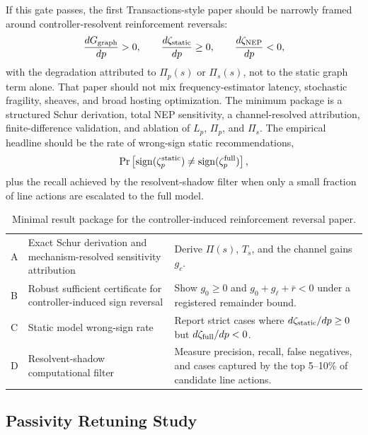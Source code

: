 If this gate passes, the first Transactions-style paper should be narrowly
framed around controller-resolvent reinforcement reversals:
\[
  \frac{dG_{\rm graph}}{dp}>0,
  \qquad
  \frac{d\zeta_{\rm static}}{dp}\ge0,
  \qquad
  \frac{d\zeta_{\rm NEP}}{dp}<0,
\]
with the degradation attributed to \(\Pi_p(s)\) or \(\Pi_s(s)\), not to the
static graph term alone. That paper should not mix frequency-estimator latency,
stochastic fragility, sheaves, and broad hosting optimization. The minimum
package is a structured Schur derivation, total NEP sensitivity, a
channel-resolved attribution, finite-difference validation, and ablation of
\(L_p\), \(\Pi_p\), and \(\Pi_s\). The empirical headline should be the rate
of wrong-sign static recommendations,
\[
  \Pr\left[
  \operatorname{sign}(\zeta_p^{\rm static})
  \ne
  \operatorname{sign}(\zeta_p^{\rm full})
  \right],
\]
plus the recall achieved by the resolvent-shadow filter when only a small
fraction of line actions are escalated to the full model.

\begin{table}[ht]
\centering
\caption{Minimal result package for the controller-induced reinforcement
reversal paper.}
\label{tab:controller_reversal_paper_package}
\begin{tabular}{L{0.18\textwidth}L{0.34\textwidth}L{0.34\textwidth}}
\toprule
{}
 &  & \\
\midrule
A & Exact Schur derivation and mechanism-resolved sensitivity attribution &
Derive \(\Pi(s)\), \(T_s\), and the channel gains \(g_c\).\\
\addlinespace
B & Robust sufficient certificate for controller-induced sign reversal &
Show \(g_0\ge0\) and \(g_0+g_\ell+\bar r<0\) under a registered remainder
bound.\\
\addlinespace
C & Static model wrong-sign rate &
Report strict cases where \(d\zeta_{\rm static}/dp\ge0\) but
\(d\zeta_{\rm full}/dp<0\).\\
\addlinespace
D & Resolvent-shadow computational filter &
Measure precision, recall, false negatives, and cases captured by the top
5--10\% of candidate line actions.\\
\bottomrule
\end{tabular}
\end{table}

\subsection{Passivity Retuning Study}

